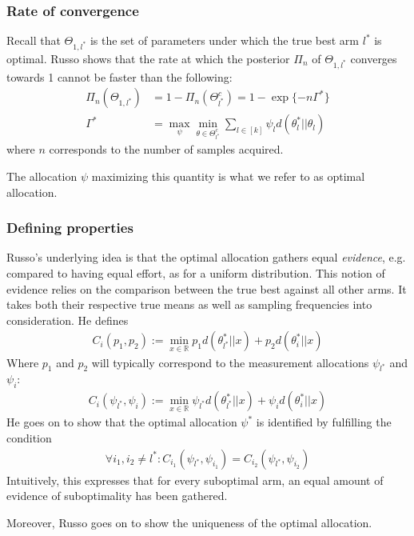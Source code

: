 \subsubsection{Rate of convergence}
Recall that $\Theta_{1, l^*}$ is the set of parameters under which the true best
arm $l^*$ is optimal. Russo \cite{DBLP:journals/corr/Russo16} shows that the
rate at which the posterior $\Pi_n$ of $\Theta_{1, l^*}$ converges towards 1
cannot be faster than the following:
\begin{align}
  \Pi_n(\Theta_{1, l^*}) &= 1 - \Pi_n(\Theta^c_{l^*}) = 1 - \exp\{-n\Gamma^*\} \\
  \Gamma^* &= \max_{\psi} \min_{\theta \in \Theta^c_{l^*}} \sum_{l \in [k]}
      \psi_l d(\theta_l^* || \theta_l)
\end{align}
where $n$ corresponds to the number of samples acquired.

The allocation $\psi$ maximizing this quantity is what we refer to as optimal
allocation.

\subsubsection{Defining properties}
Russo's underlying idea is that the optimal allocation gathers equal
\emph{evidence}, e.g. compared to having equal effort, as  for a uniform
distribution. This notion of evidence relies on the comparison between the true
best against all other arms. It takes both their respective true means as well
as sampling frequencies into consideration. He defines
\begin{align}
  C_i(p_1, p_2) := \min_{x \in \mathbb{R}} p_1 d(\theta_{l^*}^*||x) + p_2
      d(\theta_{i}^*||x)
\end{align}
Where $p_1$ and $p_2$ will typically correspond to the measurement allocations
$\psi_{l^*}$ and $\psi_{i}$:
\begin{align}
  C_i(\psi_{l^*}, \psi_i) := \min_{x \in \mathbb{R}} \psi_{l^*}
      d(\theta_{l^*}^*||x) + \psi_i d(\theta_{i}^*||x)
\end{align}
He goes on to show that the optimal allocation $\psi^*$ is
identified by fulfilling the condition
\begin{align}
  \forall i_1, i_2 \neq l^*: C_{i_1}(\psi_{l^*}, \psi_{i_1}) =
      C_{i_2}(\psi_{l^*}, \psi_{i_2})
\end{align}
Intuitively, this expresses that for every suboptimal arm, an equal amount of
evidence of suboptimality has been gathered.

Moreover, Russo goes on to show the uniqueness of the optimal allocation.

